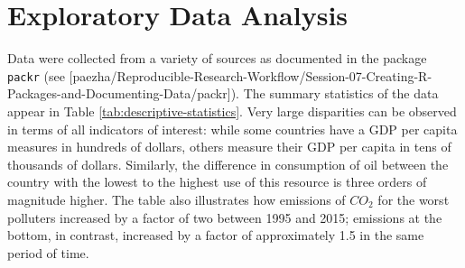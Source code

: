 \documentclass[]{elsarticle} %
\begin{document}
\hypertarget{exploratory-data-analysis}{%
\section{Exploratory Data Analysis}\label{exploratory-data-analysis}}

Data were collected from a variety of sources as documented in the
package \texttt{packr} (see
{[}paezha/Reproducible-Research-Workflow/Session-07-Creating-R-Packages-and-Documenting-Data/packr{]}).
The summary statistics of the data appear in Table
\ref{tab:descriptive-statistics}. Very large disparities can be observed
in terms of all indicators of interest: while some countries have a GDP
per capita measures in hundreds of dollars, others measure their GDP per
capita in tens of thousands of dollars. Similarly, the difference in
consumption of oil between the country with the lowest to the highest
use of this resource is three orders of magnitude higher. The table also
illustrates how emissions of \(CO_2\) for the worst polluters increased
by a factor of two between 1995 and 2015; emissions at the bottom, in
contrast, increased by a factor of approximately 1.5 in the same period
of time.

\begin{table}

\caption{\label{tab:descriptive-statistics-7}\label{tab:descriptive-statistics} Descriptive statistics: energy and emissions of world countries}
\centering
{}
\end{table}
\end{document}
